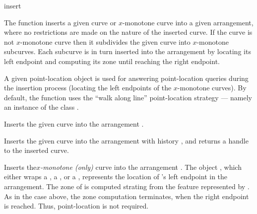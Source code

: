 \ccRefPageBegin

\begin{ccRefFunction}{insert}

\ccDefinition

The function \ccRefName{} inserts a given curve or $x$-monotone curve
into a given arrangement, where no restrictions are made on the nature
of the inserted curve. If the curve is not $x$-monotone curve then it
subdivides the given curve into $x$-monotone subcurves. Each subcurve
is in turn inserted into the arrangement by locating its left endpoint
and computing its zone until reaching the right endpoint.

A given point-location object is used for answering point-location
queries during the insertion process (locating the left endpoints of
the $x$-monotone curves). By default, the function uses the ``walk
along line'' point-location strategy --- namely an instance of the
class
.



Inserts the given curve  into the arrangement .




Inserts the given curve  into the arrangement with history
, and returns a handle to the inserted curve.

Inserts the{\em $x$-monotone (only)} curve  into the
arrangement . The object , which either
wraps a , a , or a
, represents the location of 's left
endpoint in the arrangement. The zone of  is computed strating
from the feature represented by . As in the case above, the
zone computation terminates, when the right endpoint is reached.
Thus, point-location is not required. 


\end{ccRefFunction}

